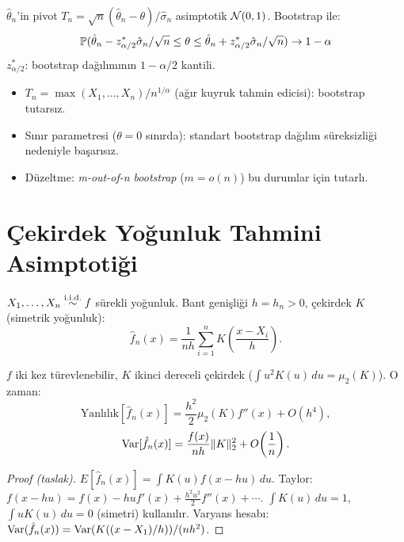 \begin{teorem}\label{thm:bootstrap_ga}
$\hat\theta_n$'in pivot $T_n=\sqrt{n}(\hat\theta_n-\theta)/\hat\sigma_n$ asimptotik $\mathcal{N}(0,1)$. Bootstrap ile:
\[
  \mathbb{P}(\hat\theta_n - z_{\alpha/2}^* \hat\sigma_n/\sqrt{n} \leq \theta \leq \hat\theta_n + z_{\alpha/2}^* \hat\sigma_n/\sqrt{n}) \to 1-\alpha
\]
$z_{\alpha/2}^*$: bootstrap dağılımının $1-\alpha/2$ kantili.
\end{teorem}

\begin{ornek}\label{ex:bootstrap_basarisiz}
\begin{itemize}
  \item $T_n = \max(X_1,\ldots,X_n)/n^{1/\alpha}$ (ağır kuyruk tahmin edicisi): bootstrap tutarsız.
  \item Sınır parametresi ($\theta=0$ sınırda): standart bootstrap dağılım süreksizliği nedeniyle başarısız.
  \item Düzeltme: \emph{m-out-of-n bootstrap} ($m=o(n)$) bu durumlar için tutarlı.
\end{itemize}
\end{ornek}

\section{Çekirdek Yoğunluk Tahmini Asimptotiği}
\label{sec:kernel_asimptotik}

\begin{tanim}\label{def:kde}
$X_1,\ldots,X_n\overset{\text{i.i.d.}}{\sim} f$ sürekli yoğunluk. Bant genişliği $h=h_n>0$, çekirdek $K$ (simetrik yoğunluk):
\[
  \hat f_n(x) = \frac{1}{nh}\sum_{i=1}^n K\!\left(\frac{x-X_i}{h}\right).
\]
\end{tanim}

\begin{teorem}\label{thm:kde_bias_var}
$f$ iki kez türevlenebilir, $K$ ikinci dereceli çekirdek ($\int u^2 K(u)\,du=\mu_2(K)$). O zaman:
\[
  \mathrm{Yanlılık}[\hat f_n(x)] = \frac{h^2}{2}\mu_2(K)f''(x) + O(h^4),
\]
\[
  \operatorname{Var}[\hat f_n(x)] = \frac{f(x)}{nh}\|K\|_2^2 + O\!\left(\frac{1}{n}\right).
\]
\end{teorem}

\begin{proof}[Proof (taslak)]
$E[\hat f_n(x)]=\int K(u)f(x-hu)\,du$. Taylor: $f(x-hu)=f(x)-huf'(x)+\frac{h^2u^2}{2}f''(x)+\cdots$. $\int K(u)\,du=1$, $\int uK(u)\,du=0$ (simetri) kullanılır. Varyans hesabı: $\operatorname{Var}(\hat f_n(x))=\operatorname{Var}(K((x-X_1)/h))/(n h^2)$.
\end{proof}

